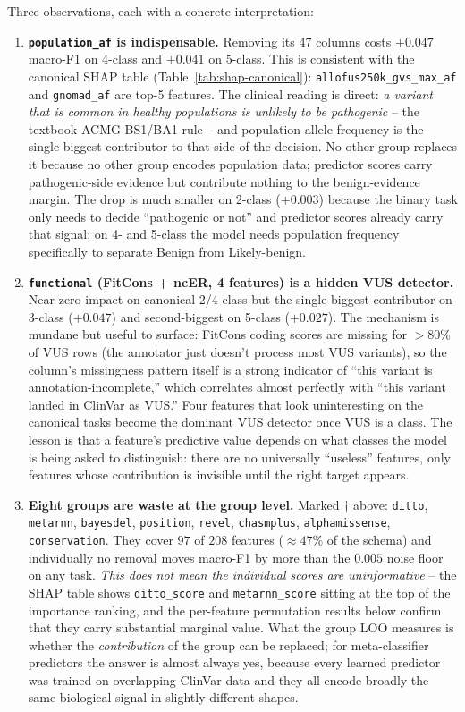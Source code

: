 \documentclass[11pt,a4paper]{article}
\begin{document}
Three observations, each with a concrete interpretation:

\begin{enumerate}[leftmargin=*]
 \item \textbf{\texttt{population\_af} is indispensable.} Removing
 its 47 columns costs $+0.047$ macro-F1 on 4-class and $+0.041$
 on 5-class. This is consistent with the canonical SHAP table
 (Table~\ref{tab:shap-canonical}): \texttt{allofus250k\_gvs\_max\_af}
 and \texttt{gnomad\_af} are top-5 features. The clinical reading
 is direct: \emph{a variant that is common in healthy populations
 is unlikely to be pathogenic} -- the textbook ACMG BS1/BA1 rule
 -- and population allele frequency is the single biggest
 contributor to that side of the decision. No other group
 replaces it because no other group encodes population data;
 predictor scores carry pathogenic-side evidence but contribute
 nothing to the benign-evidence margin. The drop is much smaller
 on 2-class ($+0.003$) because the binary task only needs to
 decide ``pathogenic or not'' and predictor scores already
 carry that signal; on 4- and 5-class the model needs population
 frequency specifically to separate Benign from Likely-benign.
 \item \textbf{\texttt{functional} (FitCons + ncER, 4 features) is
 a hidden VUS detector.} Near-zero impact on canonical 2/4-class
 but the single biggest contributor on 3-class ($+0.047$) and
 second-biggest on 5-class ($+0.027$). The mechanism is mundane
 but useful to surface: FitCons coding scores are missing for
 $>80\%$ of VUS rows (the annotator just doesn't process
 most VUS variants), so the column's missingness pattern itself
 is a strong indicator of ``this variant is annotation-incomplete,''
 which correlates almost perfectly with ``this variant landed in
 ClinVar as VUS.'' Four features that look uninteresting on the
 canonical tasks become the dominant VUS detector once VUS is a
 class. The lesson is that a feature's predictive value depends
 on what classes the model is being asked to distinguish: there
 are no universally ``useless'' features, only features whose
 contribution is invisible until the right target appears.
 \item \textbf{Eight groups are waste at the group level.} Marked
 $\dagger$ above: \texttt{ditto}, \texttt{metarnn},
 \texttt{bayesdel}, \texttt{position}, \texttt{revel},
 \texttt{chasmplus}, \texttt{alphamissense}, \texttt{conservation}.
 They cover $97$ of $208$ features ($\approx 47\%$ of the schema)
 and individually no removal moves macro-F1 by more than the
 $0.005$ noise floor on any task. \emph{This does not mean the
 individual scores are uninformative} -- the SHAP table shows
 \texttt{ditto\_score} and \texttt{metarnn\_score} sitting at
 the top of the importance ranking, and the per-feature
 permutation results below confirm that they carry substantial
 marginal value. What the group LOO measures is whether the
 \emph{contribution} of the group can be replaced; for
 meta-classifier predictors the answer is almost always yes,
 because every learned predictor was trained on overlapping
 ClinVar data and they all encode broadly the same biological
 signal in slightly different shapes.
\end{enumerate}
\end{document}
